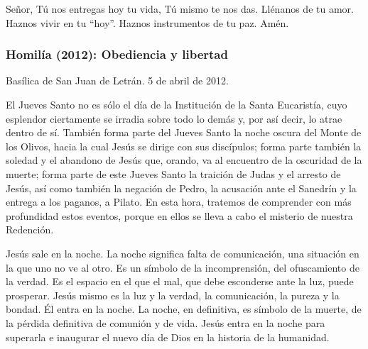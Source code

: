 			\begin{body}Señor, Tú nos entregas hoy tu vida, Tú mismo te nos das. Llénanos de tu amor. Haznos vivir en tu “hoy”. Haznos instrumentos de tu paz. Amén.\end{body}
			
			\subsubsection{Homilía (2012): Obediencia y libertad}
			
			\begin{referencia}Basílica de San Juan de Letrán. 5 de abril de 2012.\end{referencia}
			
			\begin{body}El Jueves Santo no es sólo el día de la Institución de la Santa Eucaristía, cuyo esplendor ciertamente se irradia sobre todo lo demás y, por así decir, lo atrae dentro de sí. También forma parte del Jueves Santo la noche oscura del Monte de los Olivos, hacia la cual Jesús se dirige con sus discípulos; forma parte también la soledad y el abandono de Jesús que, orando, va al encuentro de la oscuridad de la muerte; forma parte de este Jueves Santo la traición de Judas y el arresto de Jesús, así como también la negación de Pedro, la acusación ante el Sanedrín y la entrega a los paganos, a Pilato. En esta hora, tratemos de comprender con más profundidad estos eventos, porque en ellos se lleva a cabo el misterio de nuestra Redención.\end{body}
			
			\begin{body}Jesús sale en la noche. La noche significa falta de comunicación, una situación en la que uno no ve al otro. Es un símbolo de la incomprensión, del ofuscamiento de la verdad. Es el espacio en el que el mal, que debe esconderse ante la luz, puede prosperar. Jesús mismo es la luz y la verdad, la comunicación, la pureza y la bondad. Él entra en la noche. La noche, en definitiva, es símbolo de la muerte, de la pérdida definitiva de comunión y de vida. Jesús entra en la noche para superarla e inaugurar el nuevo día de Dios en la historia de la humanidad.\end{body}
			
